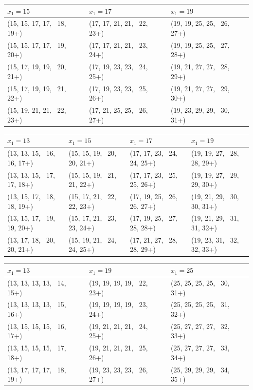 \documentclass[10pt]{article}
\theoremstyle{definition}
\begin{document}
\begin{center}
\footnotesize
\begin{tabular}{|l|l|l|}
\hline
$x_1 = 15$ & $x_1 = 17$ & $x_1 = 19$\\
\hline
(15, 15, 17, 17, \, 18, 19+)&(17, 17, 21, 21, \, 22, 23+)&(19, 19, 25, 25, \, 26, 27+)\\
(15, 15, 17, 17, \, 19, 20+)&(17, 17, 21, 21, \, 23, 24+)&(19, 19, 25, 25, \, 27, 28+)\\
(15, 17, 19, 19, \, 20, 21+)&(17, 19, 23, 23, \, 24, 25+)&(19, 21, 27, 27, \, 28, 29+)\\
(15, 17, 19, 19, \, 21, 22+)&(17, 19, 23, 23, \, 25, 26+)&(19, 21, 27, 27, \, 29, 30+)\\
(15, 19, 21, 21, \, 22, 23+)&(17, 21, 25, 25, \, 26, 27+)&(19, 23, 29, 29, \, 30, 31+)\\
\hline
\end{tabular}
\end{center}

\begin{center}
\footnotesize
\begin{tabular}{|l|l|l|l|}
\hline
$x_1 = 13$ & $x_1 = 15$ & $x_1 = 17$ & $x_1 = 19$\\
\hline
(13, 13, 15, \, 16, 16, 17+)&(15, 15, 19, \, 20, 20, 21+)&(17, 17, 23, \, 24, 24, 25+) &(19, 19, 27, \, 28, 28, 29+)\\
(13, 13, 15, \, 17, 17, 18+)&(15, 15, 19, \, 21, 21, 22+)&(17, 17, 23, \, 25, 25, 26+) &(19, 19, 27, \, 29, 29, 30+)\\
(13, 15, 17, \, 18, 18, 19+)&(15, 17, 21, \, 22, 22, 23+)&(17, 19, 25, \, 26, 26, 27+)&(19, 21, 29, \, 30, 30, 31+)\\
(13, 15, 17, \, 19, 19, 20+)&(15, 17, 21, \, 23, 23, 24+)&(17, 19, 25, \, 27, 28, 28+)&(19, 21, 29, \, 31, 31, 32+)\\
(13, 17, 18, \, 20, 20, 21+)&(15, 19, 21, \, 24, 24, 25+)&(17, 21, 27, \, 28, 28, 29+) &(19, 23, 31, \, 32, 32, 33+)\\
\hline
\end{tabular}
\end{center}

\begin{center}
\footnotesize
\begin{tabular}{|l|l|l|}
\hline
$x_1 = 13$ & $x_1 = 19$ & $x_1 = 25$\\
\hline
(13, 13, 13, 13, \, 14, 15+)&(19, 19, 19, 19, \, 22, 23+)&(25, 25, 25, 25, \, 30, 31+)\\ 
(13, 13, 13, 13, \, 15, 16+)&(19, 19, 19, 19, \, 23, 24+)&(25, 25, 25, 25, \, 31, 32+)\\
(13, 15, 15, 15, \, 16, 17+)&(19, 21, 21, 21, \, 24, 25+)&(25, 27, 27, 27, \, 32, 33+)\\
(13, 15, 15, 15, \, 17, 18+)&(19, 21, 21, 21, \, 25, 26+)&(25, 27, 27, 27, \, 33, 34+) \\
(13, 17, 17, 17, \, 18, 19+) &(19, 23, 23, 23, \, 26, 27+)&(25, 29, 29, 29, \, 34, 35+) \\  
\hline
\end{tabular}
\end{center}
\end{document}
